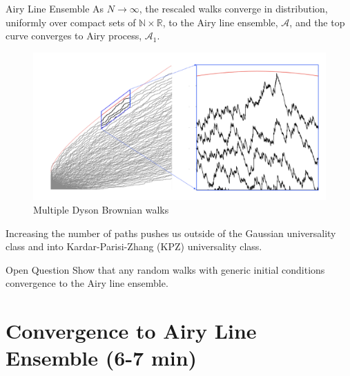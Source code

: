 \documentclass[9pt,t,dvipsnames]{beamer}
\begin{document}
\begin{frame}{Airy Line Ensemble}
As $N\rightarrow \infty$, the rescaled walks converge in distribution, uniformly over compact sets of $\mathbb{N}\times \mathbb{R}$, to the Airy line ensemble, $\mathcal{A}$, and the top curve converges to Airy process, $\mathcal{A}_1$.
\begin{figure}
	\includegraphics[height=0.25\textheight]{graphics/airy.png}
	\caption{Multiple Dyson Brownian walks}
\end{figure}
 Increasing the number of paths pushes us outside of the Gaussian universality class and into Kardar-Parisi-Zhang (KPZ) universality class.
\end{frame}

\begin{frame}{Open Question}
Show that any random walks with generic initial conditions convergence to the Airy line ensemble. 
\end{frame}


\section{Convergence to Airy Line Ensemble (6-7 min)}
\end{document}
